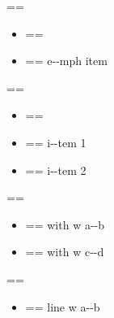 \documentclass{book}
\makeatletter
\newenvironment{Texinfopreformatted}{%
  \par\GNUTobeylines\obeyspaces\frenchspacing\parskip=\z@\parindent=\z@}{}
{\catcode`\^^M=13 \gdef\GNUTobeylines{\catcode`\^^M=13 \def^^M{\null\par}}}
\newenvironment{Texinfoindented}{\begin{list}{}{}\item\relax}{\end{list}}
\renewcommand{\_}{\Texinfounderscore\discretionary{}{}{}}
\makeatother
\begin{document}
\begin{Texinfoindented}
\begin{Texinfopreformatted}
\ttfamily 
\end{Texinfopreformatted}
\begin{itemize}[label=\emph{after emph}]
\item \begin{Texinfopreformatted}%
\ttfamily \end{Texinfopreformatted}
\item \begin{Texinfopreformatted}%
\ttfamily e{-}{-}mph item
\end{Texinfopreformatted}
\end{itemize}
\begin{Texinfopreformatted}%
\ttfamily 
\end{Texinfopreformatted}
\begin{itemize}[label=\textbullet{} a--n itemize line]
\item \begin{Texinfopreformatted}%
\ttfamily \end{Texinfopreformatted}
\item \begin{Texinfopreformatted}%
\ttfamily {}%
i{-}{-}tem 1
\end{Texinfopreformatted}
\item \begin{Texinfopreformatted}%
\ttfamily i{-}{-}tem 2
\end{Texinfopreformatted}
\end{itemize}
\begin{Texinfopreformatted}%
\ttfamily 
\end{Texinfopreformatted}
\begin{itemize}[label={}]
\item \begin{Texinfopreformatted}%
\ttfamily with w a{-}{-}b
\end{Texinfopreformatted}
\item \begin{Texinfopreformatted}%
\ttfamily with w c{-}{-}d
\end{Texinfopreformatted}
\end{itemize}
\begin{Texinfopreformatted}%
\ttfamily 
\end{Texinfopreformatted}
\begin{itemize}[label=\hbox{} on a line]
\item \begin{Texinfopreformatted}%
\ttfamily line w a{-}{-}b

\end{Texinfopreformatted}
\end{itemize}
\end{Texinfoindented}
\end{document}

